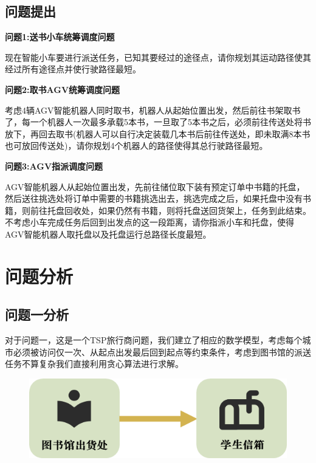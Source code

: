 \documentclass[withoutpreface,bwprint]{thesis-config}
\begin{document}
\subsection{问题提出}
\par \textbf{问题1:送书小车统筹调度问题}  
\par 现在智能小车要进行派送任务，已知其要经过的途径点，请你规划其运动路径使其经过所有途径点并使行驶路径最短。
\par \textbf{问题2:取书AGV统筹调度问题}  
\par 考虑4辆AGV智能机器人同时取书，机器人从起始位置出发，然后前往书架取书了，每一个机器人一次最多承载5本书，一旦取了5本书之后，必须前往传送处将书放下，再回去取书(机器人可以自行决定装载几本书后前往传送处，即未取满8本书也可放回传送处)，请你规划4个机器人的路径使得其总行驶路径最短。
\par \textbf{问题3:AGV指派调度问题}  
\par AGV智能机器人从起始位置出发，先前往储位取下装有预定订单中书籍的托盘，然后送往挑选处将订单中需要的书籍挑选出去，挑选完成之后，如果托盘中没有书籍，则前往托盘回收处，如果仍然有书籍，则将托盘送回货架上，任务到此结束。不考虑小车完成任务后回到出发点的这一段距离，请你指派小车和托盘，使得AGV智能机器人取托盘以及托盘运行总路径长度最短。



\section{问题分析}
\subsection{问题一分析}
对于问题一，这是一个TSP旅行商问题，我们建立了相应的数学模型，考虑每个城市必须被访问仅一次、从起点出发最后回到起点等约束条件，考虑到图书馆的派送任务不算复杂我们直接利用贪心算法进行求解。
\begin{figure}[!htbp]
    \centering
    \includegraphics[width=0.5\linewidth]{figures/str-1.png}
\end{figure}
\end{document}
